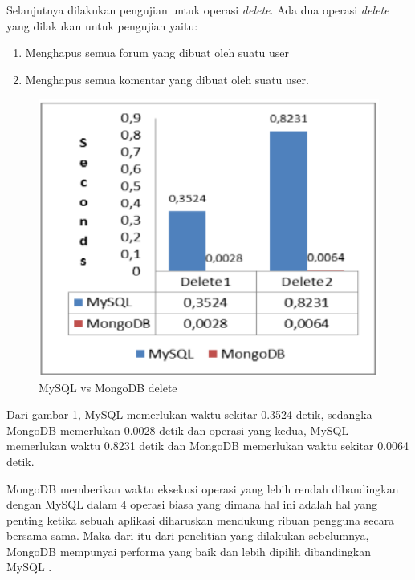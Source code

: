Selanjutnya dilakukan pengujian untuk operasi \textit{delete}. Ada dua operasi \textit{delete} yang dilakukan untuk pengujian yaitu:
\begin{enumerate}
	\item{Menghapus semua forum yang dibuat oleh suatu user}
	\item {Menghapus semua komentar yang dibuat oleh suatu user.}
\end{enumerate}

\begin{figure}[H]
	\centering
	\includegraphics[keepaspectratio, width=12cm]{gambar/2-grafik-mongomysql-4}
	\caption{MySQL vs MongoDB delete }
	\label{gambar:2-grafik-mongomysql-4}
\end{figure}

Dari gambar \ref{gambar:2-grafik-mongomysql-4}, MySQL memerlukan waktu sekitar 0.3524 detik, sedangka MongoDB memerlukan 0.0028 detik dan operasi yang kedua, MySQL memerlukan waktu 0.8231 detik dan MongoDB memerlukan waktu sekitar 0.0064 detik.

MongoDB memberikan waktu eksekusi operasi yang lebih rendah dibandingkan dengan MySQL dalam 4 operasi biasa yang dimana hal ini adalah hal yang penting ketika sebuah aplikasi diharuskan mendukung ribuan pengguna secara bersama-sama. Maka dari itu dari penelitian yang dilakukan sebelumnya, MongoDB mempunyai performa yang baik dan lebih dipilih dibandingkan MySQL \citep{mongomysqlperfomancediff}.

